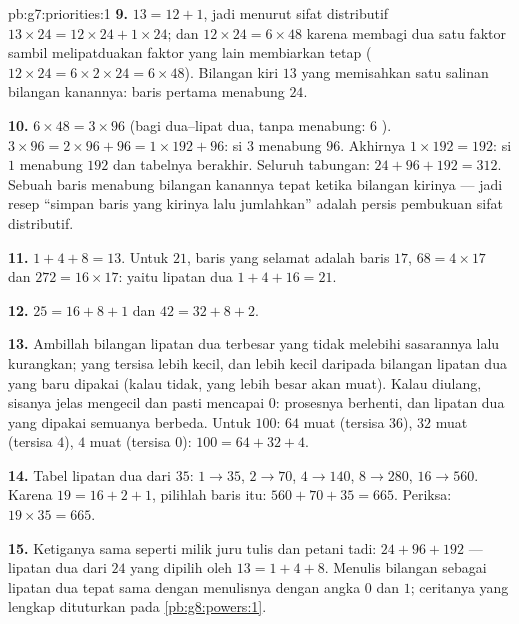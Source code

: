 \begin{solution}{pb:g7:priorities:1}
\textbf{9.} $13 = 12 + 1$, jadi menurut sifat distributif
$13 \times 24 = 12 \times 24 + 1 \times 24$; dan
$12 \times 24 = 6 \times 48$ karena membagi dua satu faktor sambil
melipatduakan faktor yang lain membiarkan  tetap
($12 \times 24 = 6 \times 2 \times 24 = 6 \times 48$). Bilangan kiri
$13$ yang  memisahkan satu salinan bilangan kanannya: baris
pertama menabung $24$.

\textbf{10.} $6 \times 48 = 3 \times 96$ (bagi dua--lipat dua, tanpa
menabung: $6$ ). $3 \times 96 = 2 \times 96 + 96 =
1 \times 192 + 96$: si  $3$ menabung $96$. Akhirnya
$1 \times 192 = 192$: si  $1$ menabung $192$ dan tabelnya
berakhir. Seluruh tabungan: $24 + 96 + 192 = 312$. Sebuah baris
menabung bilangan kanannya tepat ketika bilangan kirinya  ---
jadi resep ``simpan baris yang kirinya  lalu jumlahkan'' adalah
persis pembukuan sifat distributif.

\textbf{11.} $1 + 4 + 8 = 13$. Untuk $21$, baris yang selamat adalah
baris $17$, $68 = 4 \times 17$ dan $272 = 16 \times 17$: yaitu
lipatan dua $1 + 4 + 16 = 21$.

\textbf{12.} $25 = 16 + 8 + 1$ dan $42 = 32 + 8 + 2$.

\textbf{13.} Ambillah bilangan lipatan dua terbesar yang tidak
melebihi sasarannya lalu kurangkan; yang tersisa lebih kecil, dan
lebih kecil daripada bilangan lipatan dua yang baru dipakai (kalau
tidak, yang lebih besar akan muat). Kalau diulang, sisanya jelas
mengecil dan pasti mencapai $0$: prosesnya berhenti, dan lipatan dua
yang dipakai semuanya berbeda. Untuk $100$: $64$ muat (tersisa $36$),
$32$ muat (tersisa $4$), $4$ muat (tersisa $0$): $100 = 64 + 32 + 4$.

\textbf{14.} Tabel lipatan dua dari $35$: $1 \to 35$, $2 \to 70$,
$4 \to 140$, $8 \to 280$, $16 \to 560$. Karena
$19 = 16 + 2 + 1$, pilihlah baris itu:
$560 + 70 + 35 = 665$. Periksa: $19 \times 35 = 665$.

\textbf{15.} Ketiganya sama seperti milik juru tulis dan petani tadi:
$24 + 96 + 192$ --- lipatan dua dari $24$ yang dipilih oleh
$13 = 1 + 4 + 8$. Menulis bilangan sebagai  lipatan dua tepat
sama dengan menulisnya dengan angka $0$ dan $1$; ceritanya yang
lengkap dituturkan pada \cref{pb:g8:powers:1}.

\end{solution}
